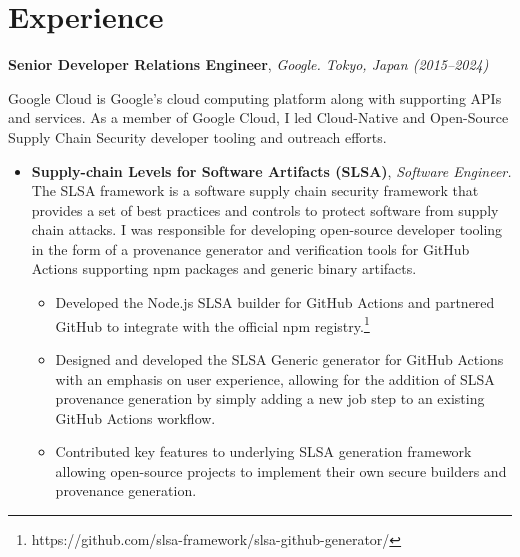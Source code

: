 \documentclass{article}
\begin{document}
\section{Experience}

\begin{list}{}{
    \setlength{\leftmargin}{0cm}	%
    \setlength{\parsep}{0.15cm}
}

    \item \textbf{\large Senior Developer Relations Engineer}, \emph{Google.
        Tokyo, Japan (2015--2024)}

    Google Cloud is Google's cloud computing platform along with supporting APIs
    and services. As a member of Google Cloud, I led Cloud-Native and
    Open-Source Supply Chain Security developer tooling and outreach efforts.

    \begin{itemize}

        \item \textbf{Supply-chain Levels for Software Artifacts (SLSA)}, \emph{Software
            Engineer.}\\
            The SLSA framework is a software supply chain security framework
            that provides a set of best practices and controls to protect
            software from supply chain attacks. I was responsible for developing
            open-source developer tooling in the form of a provenance generator
            and verification tools for GitHub Actions supporting npm packages
            and generic binary artifacts.

        \begin{itemize}

            \item Developed the Node.js SLSA builder for GitHub Actions and
                partnered GitHub to integrate with the official npm
                registry.\footnote{https://github.com/slsa-framework/slsa-github-generator/}

            \item Designed and developed the SLSA Generic generator for GitHub
                Actions with an emphasis on user experience, allowing for the
                addition of SLSA provenance generation by simply adding a new job
                step to an existing GitHub Actions workflow.

            \item Contributed key features to underlying SLSA generation
                framework allowing open-source projects to implement their own
                secure builders and provenance generation.


\end{itemize}
\end{itemize}
\end{list}
\end{document}
